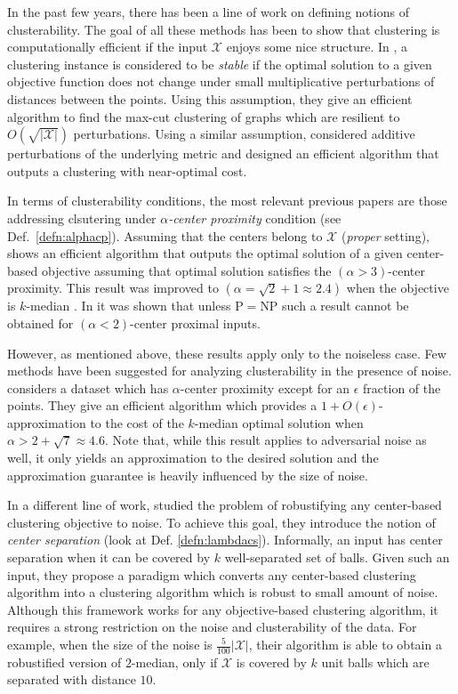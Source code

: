 \documentclass[orivec]{llncs}
\newcommand{\mc}{\mathcal}
\begin{document}
In the past few years, there has been a line of work on defining notions of clusterability. The goal of all these methods has been to show that clustering is computationally efficient if the input $\mc X$ enjoys some nice structure. In \cite{bilu2012stable}, a clustering instance is considered to be \emph{stable} if the optimal solution to a given objective function does not change under small multiplicative perturbations of distances between the points. Using this assumption, they give an efficient algorithm to find the max-cut clustering of graphs which are resilient to $O(\sqrt{|\mc X|})$ perturbations. Using a similar assumption, \cite{ackerman2009clusterability} considered additive perturbations of the underlying metric and designed an efficient algorithm that outputs a clustering with near-optimal cost. 

In terms of clusterability conditions, the most relevant previous papers are those addressing clsutering under {\em $\alpha$-center proximity} condition (see Def.~\ref{defn:alphacp}).
Assuming that the centers belong to $\mc X$ ({\em proper} setting),  \cite{awasthi2012center} shows an efficient algorithm that outputs the optimal solution of a given center-based objective assuming that optimal solution satisfies the $(\alpha > 3)$-center proximity. This result was improved to $(\alpha = \sqrt{2} + 1 \approx 2.4)$ when the objective is $k$-median \cite{balcan2012clustering}. In \cite{ben2014data} it was shown that unless P$=$NP such a result cannot be obtained for $(\alpha <2)$-center proximal inputs.

However, as mentioned above, these results apply only to the noiseless case.
Few methods have been suggested for analyzing clusterability in the presence of noise. 
\cite{balcan2012clustering} considers a dataset which has $\alpha$-center proximity except for an $\epsilon$ fraction of the points. They give an efficient algorithm which provides a $1+O(\epsilon)$-approximation to the cost of the $k$-median optimal solution when $\alpha > 2+\sqrt{7} \approx 4.6$. Note that, while this result applies to adversarial noise as well, it only yields an approximation to the desired solution and  the approximation guarantee is heavily influenced by the size of noise. 

In a different line of work, \cite{ben2014clustering} studied the problem of robustifying any center-based clustering objective to noise. To achieve this goal, they introduce the notion of {\em center separation} (look at Def. \ref{defn:lambdacs}). Informally, an input has center separation when it can be covered by $k$ well-separated set of balls.
Given such an input, they propose a paradigm which converts any center-based clustering algorithm into a clustering algorithm which is robust to small amount of noise.
Although this framework works for any objective-based clustering algorithm, it requires a strong restriction on the noise and clusterability of the data. For example, when the size of the noise is $\frac{5}{100}|\mc X|$, their algorithm is able to obtain a robustified version of $2$-median, only if $\mc X$ is covered by $k$ unit balls which are separated with distance $10$. 
\end{document}

